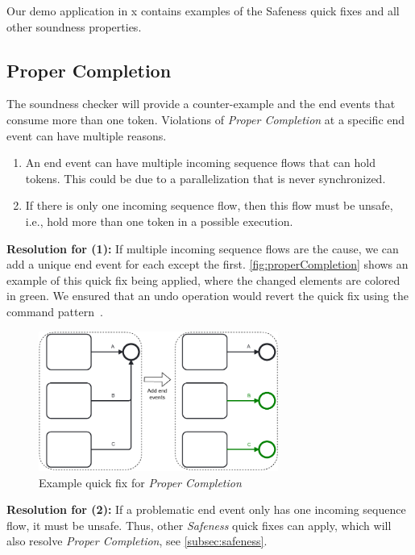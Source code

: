 \documentclass[runningheads]{llncs}
\begin{document}
Our demo application in x contains examples of the Safeness quick fixes and all other soundness properties.

\subsection{Proper Completion}
The soundness checker will provide a counter-example and the end events that consume more than one token.
Violations of \textit{Proper Completion} at a specific end event can have multiple reasons.

\begin{enumerate}
	\item An end event can have multiple incoming sequence flows that can hold tokens.
	This could be due to a parallelization that is never synchronized.
	\item If there is only one incoming sequence flow, then this flow must be unsafe, i.e., hold more than one token in a possible execution.
\end{enumerate}

\textbf{Resolution for (1):} If multiple incoming sequence flows are the cause, we can add a unique end event for each except the first.
\autoref{fig:properCompletion} shows an example of this quick fix being applied, where the changed elements are colored in green.
We ensured that an undo operation would revert the quick fix using the command pattern~\cite{gammaDesignPatternsElements1995}.

\begin{figure}[ht]
	\centering
	\includegraphics[width=0.7\textwidth]{images/properCompletion}
	\caption{Example quick fix for \textit{Proper Completion}}
	\label{fig:properCompletion}
\end{figure}

\textbf{Resolution for (2):} If a problematic end event only has one incoming sequence flow, it must be unsafe.
Thus, other \textit{Safeness} quick fixes can apply, which will also resolve \textit{Proper Completion}, see \autoref{subsec:safeness}.
\end{document}
